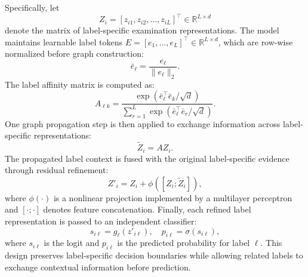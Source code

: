 \documentclass[Afour,sagev,times]{sagej}
\begin{document}
Specifically, let
\begin{equation}
Z_i=[z_{i1},z_{i2},\ldots,z_{iL}]^{\top}\in\mathbb{R}^{L\times d}
\end{equation}
denote the matrix of label-specific examination representations. The model maintains learnable label tokens $E=[e_1,\ldots,e_L]^{\top}\in\mathbb{R}^{L\times d}$, which are row-wise normalized before graph construction:
\begin{equation}
\bar{e}_{\ell}=\frac{e_{\ell}}{\|e_{\ell}\|_2}.
\end{equation}
The label affinity matrix is computed as:
\begin{equation}
A_{\ell k}=\frac{\exp(\bar{e}_{\ell}^{\top}\bar{e}_{k}/\sqrt{d})}{\sum_{r=1}^{L}\exp(\bar{e}_{\ell}^{\top}\bar{e}_{r}/\sqrt{d})}.
\end{equation}
One graph propagation step is then applied to exchange information across label-specific representations:
\begin{equation}
\tilde{Z}_{i}=AZ_i.
\end{equation}
The propagated label context is fused with the original label-specific evidence through residual refinement:
\begin{equation}
Z'_{i}=Z_i+\phi([Z_i;\tilde{Z}_{i}]),
\end{equation}
where $\phi(\cdot)$ is a nonlinear projection implemented by a multilayer perceptron and $[\cdot;\cdot]$ denotes feature concatenation. Finally, each refined label representation is passed to an independent classifier:
\begin{equation}
s_{i\ell}=g_{\ell}(z'_{i\ell}), \quad p_{i\ell}=\sigma(s_{i\ell}),
\end{equation}
where $s_{i\ell}$ is the logit and $p_{i\ell}$ is the predicted probability for label $\ell$. This design preserves label-specific decision boundaries while allowing related labels to exchange contextual information before prediction.
\end{document}
